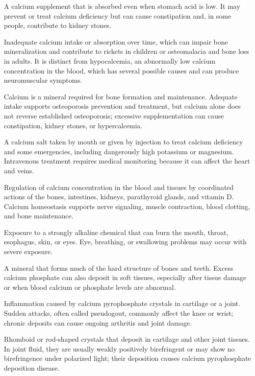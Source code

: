  A calcium supplement that is absorbed even when stomach acid is low. It may prevent or treat calcium deficiency but can cause constipation and, in some people, contribute to kidney stones.

 Inadequate calcium intake or absorption over time, which can impair bone mineralization and contribute to rickets in children or osteomalacia and bone loss in adults. It is distinct from hypocalcemia, an abnormally low calcium concentration in the blood, which has several possible causes and can produce neuromuscular symptoms.

 Calcium is a mineral required for bone formation and maintenance. Adequate intake supports osteoporosis prevention and treatment, but calcium alone does not reverse established osteoporosis; excessive supplementation can cause constipation, kidney stones, or hypercalcemia.

 A calcium salt taken by mouth or given by injection to treat calcium deficiency and some emergencies, including dangerously high potassium or magnesium. Intravenous treatment requires medical monitoring because it can affect the heart and veins.

 Regulation of calcium concentration in the blood and tissues by coordinated actions of the bones, intestines, kidneys, parathyroid glands, and vitamin D. Calcium homeostasis supports nerve signaling, muscle contraction, blood clotting, and bone maintenance.

 Exposure to a strongly alkaline chemical that can burn the mouth, throat, esophagus, skin, or eyes. Eye, breathing, or swallowing problems may occur with severe exposure.

 A mineral that forms much of the hard structure of bones and teeth. Excess calcium phosphate can also deposit in soft tissues, especially after tissue damage or when blood calcium or phosphate levels are abnormal.

 Inflammation caused by calcium pyrophosphate crystals in cartilage or a joint. Sudden attacks, often called pseudogout, commonly affect the knee or wrist; chronic deposits can cause ongoing arthritis and joint damage.

 Rhomboid or rod-shaped crystals that deposit in cartilage and other joint tissues. In joint fluid, they are usually weakly positively birefringent or may show no birefringence under polarized light; their deposition causes calcium pyrophosphate deposition disease.

